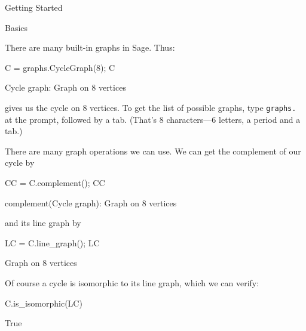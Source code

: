 \begin{chap}{Getting Started}
\begin{sect}{Basics}
\begin{sagecode}
\end{sagecode}
%
\begin{para}
There are many built-in graphs in Sage. Thus:
\end{para}
%
\begin{sagecode}
\begin{sageinput}
C = graphs.CycleGraph(8); C
\end{sageinput}
\begin{sageoutput}
Cycle graph: Graph on 8 vertices
\end{sageoutput}
\end{sagecode}
%
\begin{para}
gives us the cycle on 8 vertices. To get the list of possible graphs,
type \verb|graphs.| at the prompt, followed by a tab. (That's 8 characters---6 letters,
a period and a tab.)
\end{para}
%
\begin{para}
There are many graph operations we can use. We can get the complement of
our cycle by
\end{para}
%
\begin{sagecode}
\begin{sageinput}
CC = C.complement(); CC
\end{sageinput}
\begin{sageoutput}
complement(Cycle graph): Graph on 8 vertices
\end{sageoutput}
\end{sagecode}
%
\begin{para}
and its line graph by
\end{para}
%
\begin{sagecode}
\begin{sageinput}
LC = C.line_graph(); LC
\end{sageinput}
\begin{sageoutput}
Graph on 8 vertices
\end{sageoutput}
\end{sagecode}
%
\begin{para}
Of course a cycle is isomorphic to its line graph, which we can verify:
\end{para}
%
\begin{sagecode}
\begin{sageinput}
C.is_isomorphic(LC)
\end{sageinput}
\begin{sageoutput}
True
\end{sageoutput}
\end{sagecode}
%
\begin{para}

\end{para}
\end{sect}
\end{chap}
